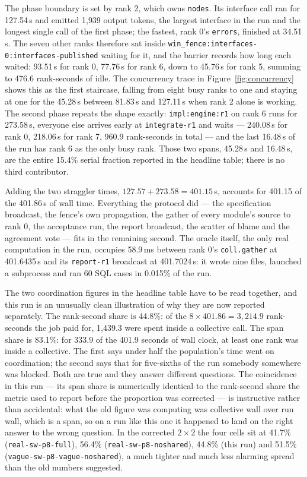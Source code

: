 \documentclass[11pt]{article}
\begin{document}
The phase boundary is set by rank 2, which owns \texttt{nodes}. Its interface call ran for
127.54\,s and emitted 1{,}939 output tokens, the largest interface in the run and the longest
single call of the first phase; the fastest, rank 0's \texttt{errors}, finished at 34.51\,s. The
seven other ranks therefore sat inside \texttt{win\_fence:interfaces-0:interfaces-published}
waiting for it, and the barrier records how long each waited: 93.51\,s for rank 0, 77.76\,s for
rank 6, down to 45.76\,s for rank 5, summing to 476.6 rank-seconds of idle. The concurrency trace
in Figure~\ref{fig:concurrency} shows this as the first staircase, falling from eight busy ranks
to one and staying at one for the 45.28\,s between 81.83\,s and 127.11\,s when rank 2 alone is
working. The second phase repeats the shape exactly: \texttt{impl:engine:r1} on rank 6 runs for
273.58\,s, everyone else arrives early at \texttt{integrate-r1} and waits --- 240.08\,s for rank
0, 218.06\,s for rank 7, 960.9 rank-seconds in total --- and the last 16.48\,s of the run has
rank 6 as the only busy rank. Those two spans, 45.28\,s and 16.48\,s, are the entire 15.4\%
serial fraction reported in the headline table; there is no third contributor.

Adding the two straggler times, $127.57 + 273.58 = 401.15$\,s, accounts for 401.15 of the
401.86\,s of wall time. Everything the protocol did --- the specification broadcast, the fence's
own propagation, the gather of every module's source to rank 0, the acceptance run, the report
broadcast, the scatter of blame and the agreement vote --- fits in the remaining second. The
oracle itself, the
only real computation in the run, occupies 58.9\,ms between rank 0's \texttt{coll.gather} at
401.6435\,s and its \texttt{report-r1} broadcast at 401.7024\,s: it wrote nine files, launched a
subprocess and ran 60 SQL cases in 0.015\% of the run.

The two coordination figures in the headline table have to be read together, and this run is an
unusually clean illustration of why they are now reported separately. The rank-second share is
44.8\%: of the $8 \times 401.86 = 3{,}214.9$ rank-seconds the job paid for, 1{,}439.3 were spent
inside a collective call. The span share is 83.1\%: for 333.9 of the 401.9 seconds of wall clock,
at least one rank was inside a collective. The first says under half the population's time went
on coordination; the second says that for five-sixths of the run somebody somewhere was blocked.
Both are true and they answer different questions. The coincidence in this run --- its span share
is numerically identical to the rank-second share the metric used to report before the
proportion was corrected --- is instructive rather than accidental: what the old figure was
computing was collective wall over run wall, which is a span, so on a run like this one it
happened to land on the right answer to the wrong question. In the corrected $2\times2$ the four
cells sit at 41.7\% (\texttt{real-sw-p8-full}), 56.4\% (\texttt{real-sw-p8-noshared}), 44.8\%
(this run) and 51.5\% (\texttt{vague-sw-p8-vague-noshared}), a much tighter and much less
alarming spread than the old numbers suggested.
\end{document}
